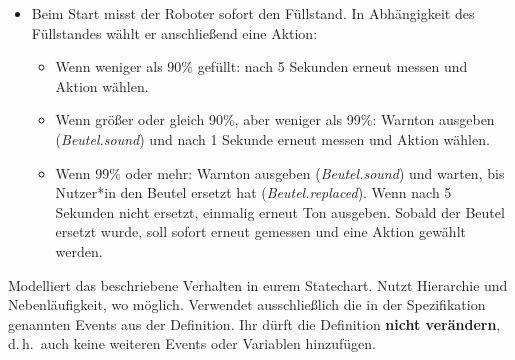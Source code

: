\begin{enumerate}[a)]
\begin{itemize}
\begin{itemize}
  \item Anschließend wartet der Roboter auf das Messergebnis. Das Event
  \textit{Sensor.dust\_checked} gibt an, dass der Sensor das Ergebnis in der Variablen
  \textit{Sensor.dust\_level} gespeichert hat. Dann kann der Roboter den Wert auslesen.
  \end{itemize}

\item Beim Start misst der Roboter sofort den Füllstand. In Abhängigkeit des Füllstandes wählt er anschließend
eine Aktion:
  \begin{itemize}
  \item Wenn weniger als 90\% gefüllt: nach 5 Sekunden erneut messen und Aktion wählen.

  \item Wenn größer oder gleich 90\%, aber weniger als 99\%: Warnton ausgeben
  (\textit{Beutel.sound}) und nach 1 Sekunde erneut messen und Aktion wählen.

  \item Wenn 99\% oder mehr: Warnton ausgeben (\textit{Beutel.sound}) und warten, bis Nutzer*in den Beutel
  ersetzt hat (\textit{Beutel.replaced}). Wenn nach 5 Sekunden nicht ersetzt, einmalig erneut Ton ausgeben.
  Sobald der Beutel ersetzt wurde, soll sofort erneut gemessen und eine Aktion gewählt werden.
  \end{itemize}
\end{itemize}

Modelliert das beschriebene Verhalten in eurem Statechart. Nutzt Hierarchie und Nebenläufigkeit, wo möglich.
Verwendet ausschließlich die in der Spezifikation genannten Events aus der Definition. Ihr dürft die Definition
\textbf{nicht verändern}, d.\,h.\ auch keine weiteren Events oder Variablen hinzufügen.
\end{enumerate}

